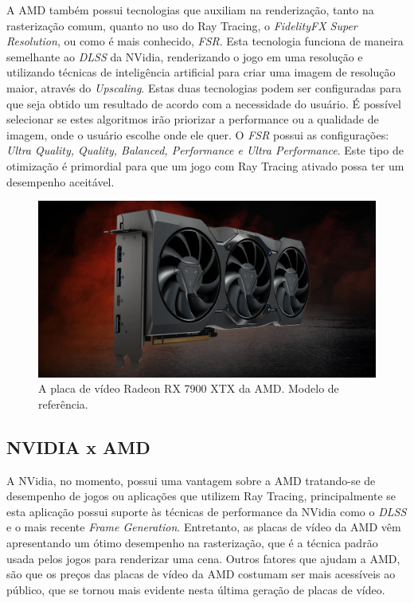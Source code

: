 \documentclass[journal]{IEEEtran}
\begin{document}
A AMD também possui tecnologias que auxiliam na renderização, tanto na rasterização comum,
quanto no uso do Ray Tracing, o \emph{FidelityFX Super Resolution}, ou como é mais conhecido,
\emph{FSR}. Esta tecnologia funciona de maneira semelhante ao \emph{DLSS} da NVidia, renderizando
o jogo em uma resolução e utilizando técnicas de inteligência artificial para criar uma imagem
de resolução maior, através do \emph{Upscaling}. Estas duas tecnologias podem ser configuradas
para que seja obtido um
resultado de acordo com a necessidade do usuário. É possível selecionar se estes algoritmos
irão priorizar a performance ou a qualidade de imagem, onde o usuário escolhe onde ele quer.
O \emph{FSR} possui as configurações: \emph{Ultra Quality, Quality, Balanced, Performance e
Ultra Performance}. Este tipo de otimização é primordial para que um jogo com Ray Tracing
ativado possa ter um desempenho aceitável.

\begin{figure}[ht]
  \centering
  \includegraphics[width=\linewidth]{media/rx7900xtx.png}
  \caption{A placa de vídeo Radeon RX 7900 XTX da AMD. Modelo de referência.}
  \label{img_rx7900xtx}
\end{figure}

\subsection{NVIDIA x AMD}
A NVidia, no momento, possui uma vantagem sobre a AMD tratando-se de desempenho de jogos
ou aplicações que utilizem Ray Tracing, principalmente se esta aplicação possui suporte
às técnicas de performance da NVidia como o \emph{DLSS} e o mais recente \emph{Frame
Generation}. Entretanto, as placas de vídeo da AMD vêm apresentando um ótimo desempenho
na rasterização, que é a técnica padrão usada pelos jogos para renderizar uma cena. Outros
fatores que ajudam a AMD, são que os preços das placas de vídeo da AMD costumam ser mais
acessíveis ao público, que se tornou mais evidente nesta última geração de placas de vídeo.
\end{document}
